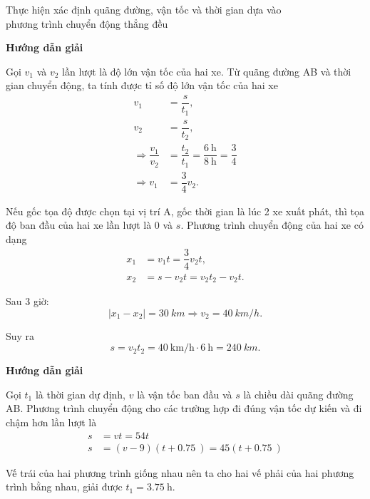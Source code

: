 \begin{dang}{Thực hiện xác định quãng đường, vận tốc và thời gian dựa vào \\phương trình chuyển động thẳng đều}
	{	\begin{center}
			\textbf{Hướng dẫn giải}
		\end{center}
		
		Gọi $v_1$ và $v_2$ lần lượt là độ lớn vận tốc của hai xe. Từ quãng đường AB và thời gian chuyển động, ta tính được tỉ số độ lớn vận tốc của hai xe
		\begin{align*}
			v_1&=\dfrac{s}{t_1},\\
			v_2&=\dfrac{s}{t_2},\\
			\Rightarrow \dfrac{v_1}{v_2}&=\dfrac{t_2}{t_1}=\dfrac{\SI{6}{\hour}}{\SI{8}{\hour}}=\dfrac{3}{4}\\
			\Rightarrow v_1&=\dfrac{3}{4} v_2.
		\end{align*}
		
		Nếu gốc tọa độ được chọn tại vị trí A, gốc thời gian là lúc 2 xe xuất phát, thì tọa độ ban đầu của hai xe lần lượt là 0 và $s$. Phương trình chuyển động của hai xe có dạng
		\begin{align*}
			x_1 &=v_1t=\dfrac{3}{4}v_2 t,\\
			x_2&=s-v_2t=v_2t_2-v_2t.
		\end{align*}
		
		Sau 3 giờ: $$|x_1-x_2|=\SI{30}{km} \Rightarrow v_2=\SI{40}{km/h}.$$
		
		Suy ra $$s=v_2t_2=\SI{40}{\kilo\meter/\hour}\cdot\SI{6}{\hour} =\SI{240}{km}.$$
		
	}
	{	\begin{center}
			\textbf{Hướng dẫn giải}
		\end{center}
		
		Gọi $t_1$ là thời gian dự định, $v$ là vận tốc ban đầu và $s$ là chiều dài quãng đường AB. Phương trình chuyển động cho các trường hợp đi đúng vận tốc dự kiến và đi chậm hơn lần lượt là 
			\begin{align*}
				s&=vt=54t\\
				s&=(v-9)(t+\SI{0.75}{})=45(t+\SI{0.75}{})
			\end{align*}
		
		Vế trái của hai phương trình giống nhau nên ta cho hai vế phải của hai phương trình bằng nhau, giải được $t_1 =\SI{3,75}{\hour}$.	
		
	}
\end{dang}
